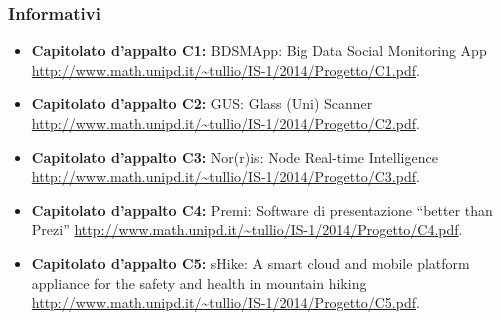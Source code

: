 \subsubsection{Informativi}
\begin{itemize}
\item \textbf{Capitolato d’appalto C1:} BDSMApp: Big Data Social Monitoring App \\
\url{http://www.math.unipd.it/~tullio/IS-1/2014/Progetto/C1.pdf}.
\item \textbf{Capitolato d’appalto C2:} GUS: Glass (Uni) Scanner \\
\url{http://www.math.unipd.it/~tullio/IS-1/2014/Progetto/C2.pdf}.
\item \textbf{Capitolato d’appalto C3:} Nor(r)is: Node Real-time Intelligence \\
\url{http://www.math.unipd.it/~tullio/IS-1/2014/Progetto/C3.pdf}.
\item \textbf{Capitolato d’appalto C4:} Premi: Software di presentazione “better than Prezi”
\url{http://www.math.unipd.it/~tullio/IS-1/2014/Progetto/C4.pdf}. \\
\item \textbf{Capitolato d’appalto C5:} sHike: A smart cloud and mobile platform appliance for the safety and health in mountain hiking \\
\url{http://www.math.unipd.it/~tullio/IS-1/2014/Progetto/C5.pdf}.
\end{itemize}